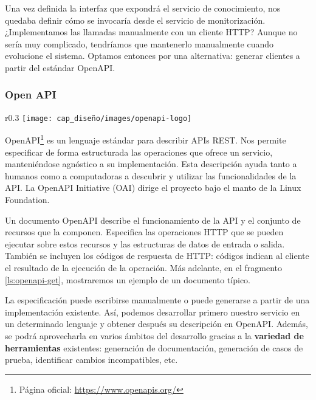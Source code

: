 Una vez definida la interfaz que expondrá el servicio de conocimiento, nos quedaba definir cómo se invocaría desde el servicio de monitorización. ¿Implementamos las llamadas manualmente con un cliente HTTP? Aunque no sería muy complicado, tendríamos que mantenerlo manualmente cuando evolucione el sistema. Optamos entonces por una alternativa: generar clientes a partir del estándar OpenAPI.

\subsubsection{Open API}
\label{chap:OpenAPI}

\begin{wrapfigure}{r}{0.3\linewidth}
  \vspace{5pt}
  \texttt{[image: cap\_diseño/images/openapi-logo]}
  \centering
  \vspace{5pt}
\end{wrapfigure}

OpenAPI\footnote{Página oficial: \url{https://www.openapis.org/}} es un lenguaje estándar para describir APIs REST. Nos permite especificar de forma estructurada las operaciones que ofrece un servicio, manteniéndose agnóstico a su implementación. Esta descripción ayuda tanto a humanos como a computadoras a descubrir y utilizar las funcionalidades de la API.\cite{openapiinitiativeOpenAPISpecificationV3} La OpenAPI Initiative (OAI) dirige el proyecto bajo el manto de la Linux Foundation.

Un documento OpenAPI describe el funcionamiento de la API y el conjunto de recursos que la componen. Especifica las operaciones HTTP que se pueden ejecutar sobre estos recursos y las estructuras de datos de entrada o salida. También se incluyen los códigos de respuesta de HTTP: códigos indican al cliente el resultado de la ejecución de la operación. \cite{openapiinitiativeOpenAPISpecificationV3} Más adelante, en el fragmento \ref{ls:openapi-get}, mostraremos un ejemplo de un documento típico.

La especificación puede escribirse manualmente o puede generarse a partir de una implementación existente. Así, podemos desarrollar primero nuestro servicio en un determinado lenguaje y obtener después su descripción en OpenAPI. Además, se podrá aprovecharla en varios ámbitos del desarrollo gracias a la  \textbf{variedad de herramientas} existentes: generación de documentación, generación de casos de prueba, identificar cambios incompatibles, etc. \cite{westerveldChapterOpenAPIAPI2021}

